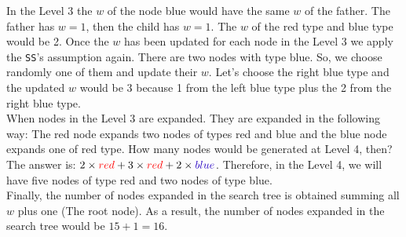 In the Level 3 the $w$ of the node blue would have the same $w$ of the father. The father has $w = 1$, then the child has $w = 1$. The $w$ of the red type and blue type would be 2. Once the $w$ has been updated for each node in the Level 3 we apply the \texttt{SS}'s assumption again. There are two nodes with type blue. So, we choose randomly one of them and update their $w$. Let's choose the right blue type and the updated $w$ would be 3 because 1 from the left blue type plus the 2 from the right blue type.\\

When nodes in the Level 3 are expanded. They are expanded in the following way: The red node expands two nodes of types red and blue and the blue node expands one of red type. How many nodes would be generated at Level 4, then? The answer is: $2 \times \textcolor{red}{red} + 3 \times \textcolor{red}{red} + 2 \times \textcolor{blue}{blue}$. Therefore, in the Level 4, we will have five nodes of type red and two nodes of type blue.\\

Finally, the number of nodes expanded in the search tree is obtained summing all $w$ plus one (The root node). As a result, the number of nodes expanded in the search tree would be $ 15 + 1 = 16$.\\

\clearpage